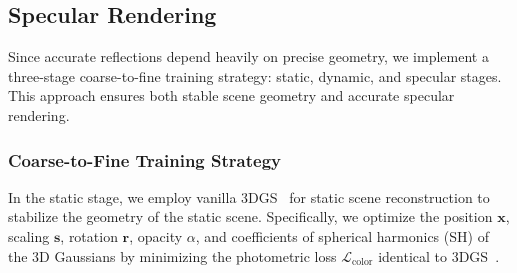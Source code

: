 \subsection{Specular Rendering}
\label{sec:Specular Rendering}
Since accurate reflections depend heavily on precise geometry, we implement a three-stage coarse-to-fine training strategy: static, dynamic, and specular stages. This approach ensures both stable scene geometry and accurate specular rendering.






\subsubsection{Coarse-to-Fine Training Strategy} \label{sec:coarse_to_fine}
In the static stage, we employ vanilla 3DGS~\cite{kerbl20233d} for static scene reconstruction to stabilize the geometry of the static scene. Specifically, we optimize the position $\bm{x}$, scaling $\bm{s}$, rotation $\bm{r}$, opacity $\alpha$, and coefficients of spherical harmonics (SH) of the 3D Gaussians by minimizing the photometric loss $\mathcal{L}_{\text{color}}$ identical to 3DGS~\citep{kerbl20233d}.


